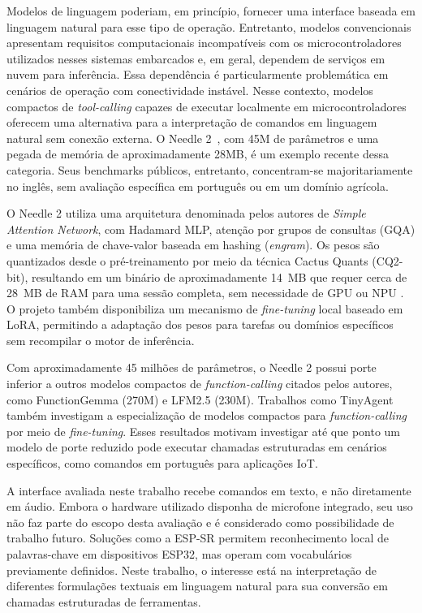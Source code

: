 \documentclass[12pt]{article}
\begin{document}
Modelos de linguagem poderiam, em princípio, fornecer uma interface baseada em linguagem natural para esse tipo de operação. Entretanto, modelos convencionais apresentam requisitos computacionais incompatíveis com os microcontroladores utilizados nesses sistemas embarcados e, em geral, dependem de serviços em nuvem para inferência. Essa dependência é particularmente problemática em cenários de operação com conectividade instável. Nesse contexto, modelos compactos de \textit{tool-calling} capazes de executar localmente em microcontroladores oferecem uma alternativa para a interpretação de comandos em linguagem natural sem conexão externa. O Needle 2~\cite{ndubuaku2026controlled,cactusneedle2repo}, com 45M de parâmetros e uma pegada de memória de aproximadamente 28MB, é um exemplo recente dessa categoria. Seus benchmarks públicos, entretanto, concentram-se majoritariamente no inglês, sem avaliação específica em português ou em um domínio agrícola.

O Needle 2 \cite{ndubuaku2026controlled} utiliza uma arquitetura denominada pelos autores de \textit{Simple Attention Network}, com Hadamard MLP, atenção por grupos de consultas (GQA) e uma memória de chave-valor baseada em hashing (\textit{engram}). Os pesos são quantizados desde o pré-treinamento por meio da técnica Cactus Quants (CQ2-bit), resultando em um binário de aproximadamente 14~MB que requer cerca de 28~MB de RAM para uma sessão completa, sem necessidade de GPU ou NPU \cite{cactusneedle2repo}. O projeto também disponibiliza um mecanismo de \textit{fine-tuning} local baseado em LoRA, permitindo a adaptação dos
pesos para tarefas ou domínios específicos sem recompilar o motor de
inferência.

Com aproximadamente 45 milhões de parâmetros, o Needle 2 possui porte
inferior a outros modelos compactos de \textit{function-calling} citados
pelos autores, como FunctionGemma (270M) e LFM2.5 (230M). Trabalhos como
TinyAgent \cite{erdogan2024tinyagent} também investigam a especialização
de modelos compactos para \textit{function-calling} por meio de
\textit{fine-tuning}. Esses resultados motivam investigar até que ponto
um modelo de porte reduzido pode executar chamadas estruturadas em
cenários específicos, como comandos em português para aplicações IoT.

A interface avaliada neste trabalho recebe comandos em texto, e não
diretamente em áudio. Embora o hardware utilizado disponha de microfone
integrado, seu uso não faz parte do escopo desta avaliação e é considerado
como possibilidade de trabalho futuro. Soluções como a ESP-SR
\cite{espressif2026espsr} permitem reconhecimento local de palavras-chave
em dispositivos ESP32, mas operam com vocabulários previamente definidos.
Neste trabalho, o interesse está na interpretação de diferentes
formulações textuais em linguagem natural para sua conversão em chamadas
estruturadas de ferramentas.
\end{document}
